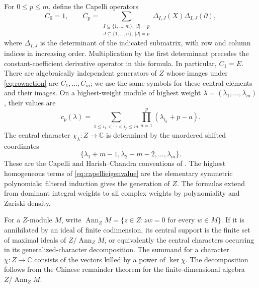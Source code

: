 \documentclass[11pt,a4paper]{article}
\numberwithin{equation}{section}
\theoremstyle{definition}
\newcommand{\C}{\mathbb C}
\DeclareMathOperator{\Ann}{Ann}
\begin{document}
For $0\le p\le m$, define the Capelli operators
\begin{equation}\label{eq:capellidefinition}
C_0=1,\qquad
C_p=\sum_{\substack{I\subseteq\{1,\ldots,m\},\ |I|=p\\
                   J\subseteq\{1,\ldots,n\},\ |J|=p}}
       \Delta_{I,J}(X)\Delta_{I,J}(\partial),
\end{equation}
where $\Delta_{I,J}$ is the determinant of the indicated submatrix,
with row and column indices in increasing order. Multiplication by
the first determinant precedes the constant-coefficient derivative
operator in this formula. In particular, $C_1=E$.
There are algebraically independent generators of $Z$ whose images
under \eqref{eq:rowaction} are $C_1,\ldots,C_m$; we use the same
symbols for these central elements and their images.
On a highest-weight module of highest weight
$\lambda=(\lambda_1,\ldots,\lambda_m)$, their values are
\begin{equation}\label{eq:capellieigenvalue}
c_p(\lambda)=\sum_{1\le i_1<\cdots<i_p\le m}
                         \prod_{a=1}^p(\lambda_{i_a}+p-a).
\end{equation}
The central character $\chi_\lambda:Z\to\C$ is determined by the
unordered shifted coordinates
\begin{equation}\label{eq:HC}
\{\lambda_1+m-1,\lambda_2+m-2,\ldots,\lambda_m\}.
\end{equation}
These are the Capelli and Harish--Chandra conventions of
\cite[(0.9), (0.10), Example~6.2, Proposition~6.5, Theorem~6.7]{OO}.
The highest homogeneous terms of \eqref{eq:capellieigenvalue} are the
elementary symmetric polynomials; filtered induction gives the
generation of $Z$. The formulas extend from dominant integral weights
to all complex weights by polynomiality and Zariski density.

For a $Z$-module $M$, write
$\Ann_Z M=\{z\in Z:zw=0\text{ for every }w\in M\}$.
If it is annihilated by an ideal of finite codimension,
its central support is the finite set of maximal ideals of
$Z/\Ann_Z M$, or equivalently the central characters occurring in
its generalized-character decomposition. The summand for a character
$\chi:Z\to\C$ consists of the vectors killed by a power of
$\ker\chi$. The decomposition follows from the Chinese remainder
theorem for the finite-dimensional algebra $Z/\Ann_Z M$.
\end{document}
